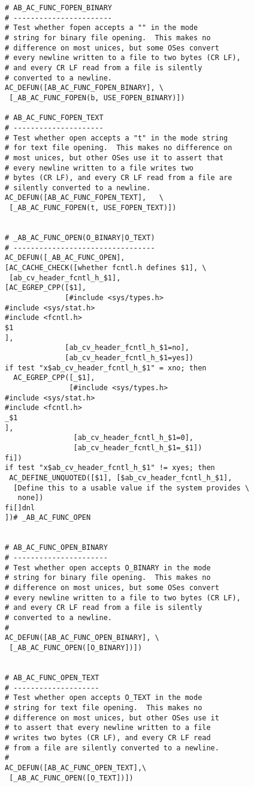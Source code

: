 \begin{description}
\begin{Verbatim}[frame=single]
# AB_AC_FUNC_FOPEN_BINARY
# -----------------------
# Test whether fopen accepts a "" in the mode 
# string for binary file opening.  This makes no 
# difference on most unices, but some OSes convert 
# every newline written to a file to two bytes (CR LF),
# and every CR LF read from a file is silently 
# converted to a newline.
AC_DEFUN([AB_AC_FUNC_FOPEN_BINARY], \
 [_AB_AC_FUNC_FOPEN(b, USE_FOPEN_BINARY)])

# AB_AC_FUNC_FOPEN_TEXT
# ---------------------
# Test whether open accepts a "t" in the mode string 
# for text file opening.  This makes no difference on 
# most unices, but other OSes use it to assert that 
# every newline written to a file writes two 
# bytes (CR LF), and every CR LF read from a file are 
# silently converted to a newline.
AC_DEFUN([AB_AC_FUNC_FOPEN_TEXT],   \
 [_AB_AC_FUNC_FOPEN(t, USE_FOPEN_TEXT)])


# _AB_AC_FUNC_OPEN(O_BINARY|O_TEXT)
# ---------------------------------
AC_DEFUN([_AB_AC_FUNC_OPEN],
[AC_CACHE_CHECK([whether fcntl.h defines $1], \
 [ab_cv_header_fcntl_h_$1],
[AC_EGREP_CPP([$1],
              [#include <sys/types.h>
#include <sys/stat.h>
#include <fcntl.h>
$1
],
              [ab_cv_header_fcntl_h_$1=no],
              [ab_cv_header_fcntl_h_$1=yes])
if test "x$ab_cv_header_fcntl_h_$1" = xno; then
  AC_EGREP_CPP([_$1],
               [#include <sys/types.h>
#include <sys/stat.h>
#include <fcntl.h>
_$1
],
                [ab_cv_header_fcntl_h_$1=0],
                [ab_cv_header_fcntl_h_$1=_$1])
fi])
if test "x$ab_cv_header_fcntl_h_$1" != xyes; then
 AC_DEFINE_UNQUOTED([$1], [$ab_cv_header_fcntl_h_$1],
  [Define this to a usable value if the system provides \
   none])
fi[]dnl
])# _AB_AC_FUNC_OPEN


# AB_AC_FUNC_OPEN_BINARY
# ----------------------
# Test whether open accepts O_BINARY in the mode 
# string for binary file opening.  This makes no 
# difference on most unices, but some OSes convert 
# every newline written to a file to two bytes (CR LF),
# and every CR LF read from a file is silently 
# converted to a newline.
#
AC_DEFUN([AB_AC_FUNC_OPEN_BINARY], \
 [_AB_AC_FUNC_OPEN([O_BINARY])])


# AB_AC_FUNC_OPEN_TEXT
# --------------------
# Test whether open accepts O_TEXT in the mode 
# string for text file opening.  This makes no 
# difference on most unices, but other OSes use it 
# to assert that every newline written to a file 
# writes two bytes (CR LF), and every CR LF read 
# from a file are silently converted to a newline.
#
AC_DEFUN([AB_AC_FUNC_OPEN_TEXT],\
 [_AB_AC_FUNC_OPEN([O_TEXT])])
\end{Verbatim}


\end{description}
